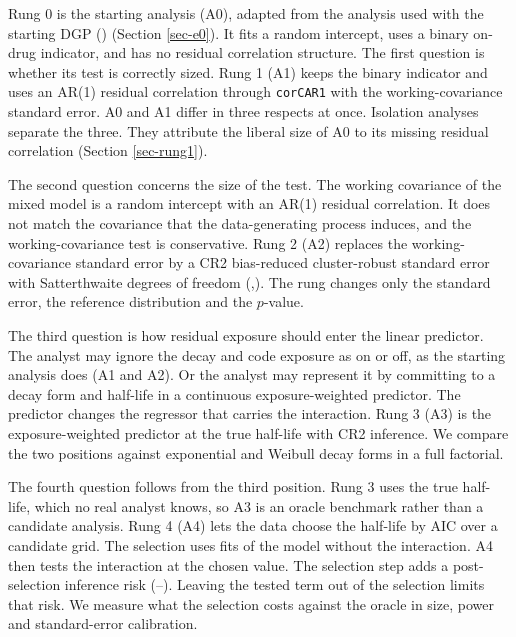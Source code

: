 \documentclass[
  11pt,
]{article}
\begin{document}
Rung 0 is the starting analysis (A0), adapted from the analysis used
with the starting DGP () (Section \ref{sec-e0}). It
fits a random intercept, uses a binary on-drug indicator, and has no
residual correlation structure. The first question is whether its
test is correctly sized. Rung 1 (A1) keeps the binary indicator and
uses an AR(1) residual correlation through \texttt{corCAR1} with the
working-covariance standard error. A0 and A1 differ in three respects
at once. Isolation analyses separate the three. They attribute the
liberal size of A0 to its missing residual correlation (Section
\ref{sec-rung1}).

The second question concerns the size of the test. The working
covariance of the mixed model is a random intercept with an AR(1)
residual correlation. It does not match the covariance that the
data-generating process induces, and the working-covariance test is
conservative. Rung 2 (A2) replaces the working-covariance standard
error by a CR2 bias-reduced cluster-robust standard error with
Satterthwaite degrees of freedom (,).
The rung changes only the standard error, the reference distribution
and the \(p\)-value.

The third question is how residual exposure should enter the linear
predictor. The analyst may ignore the decay and code exposure as on or
off, as the starting analysis does (A1 and A2). Or the analyst may
represent it by committing to a decay form and half-life in a
continuous exposure-weighted predictor. The predictor changes the
regressor that carries the interaction. Rung 3 (A3) is the
exposure-weighted predictor at the true half-life with CR2 inference.
We compare the two positions against exponential and Weibull decay
forms in a full factorial.

The fourth question follows from the third position. Rung 3 uses the
true half-life, which no real analyst knows, so A3 is an oracle
benchmark rather than a candidate analysis. Rung 4 (A4) lets the data
choose the half-life by AIC over a candidate grid. The selection uses
fits of the model without the interaction. A4 then tests the
interaction at the chosen value. The selection step adds a
post-selection inference risk
(--). Leaving the tested
term out of the selection limits that risk. We measure what the
selection costs against the oracle in size, power and standard-error
calibration.
\end{document}
